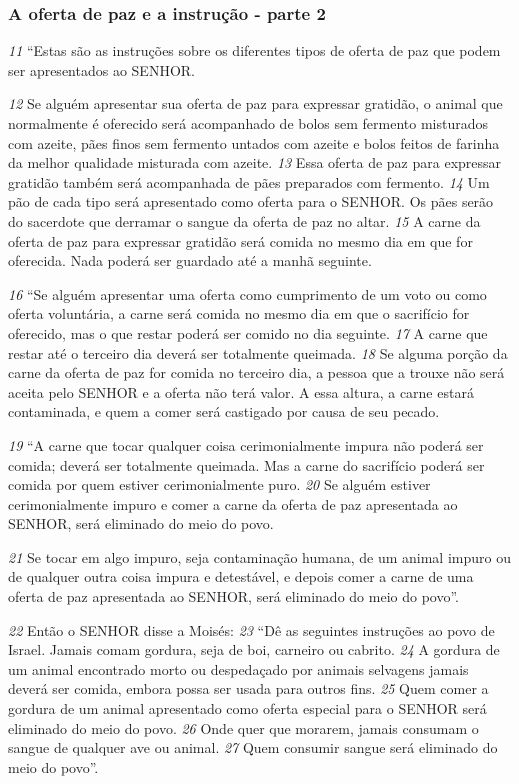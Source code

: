 \bigskip
\subsubsection*{A oferta de paz e a instrução - parte 2}  
\textit{\tiny 11}
“Estas são as instruções sobre os diferentes tipos de oferta de paz que podem
ser apresentados ao SENHOR. 

\smallskip
\textit{\tiny 12}
Se alguém apresentar sua oferta de paz para
expressar gratidão, o animal que normalmente é oferecido será acompanhado de
bolos sem fermento misturados com azeite, pães finos sem fermento untados
com azeite e bolos feitos de farinha da melhor qualidade misturada com azeite.
\textit{\tiny 13}
Essa oferta de paz para expressar gratidão também será acompanhada de pães
preparados com fermento. 
\textit{\tiny 14}
Um pão de cada tipo será apresentado como oferta
para o SENHOR. Os pães serão do sacerdote que derramar o sangue da oferta de
paz no altar. 
\textit{\tiny 15}
A carne da oferta de paz para expressar gratidão será comida no
mesmo dia em que for oferecida. Nada poderá ser guardado até a manhã
seguinte.
   
\smallskip
\textit{\tiny 16}
“Se alguém apresentar uma oferta como cumprimento de um voto ou como
oferta voluntária, a carne será comida no mesmo dia em que o sacrifício for
oferecido, mas o que restar poderá ser comido no dia seguinte. 
\textit{\tiny 17}
A carne que
restar até o terceiro dia deverá ser totalmente queimada. 
\textit{\tiny 18}
Se alguma porção da
carne da oferta de paz for comida no terceiro dia, a pessoa que a trouxe não será
aceita pelo SENHOR e a oferta não terá valor. A essa altura, a carne estará
contaminada, e quem a comer será castigado por causa de seu pecado.
   
\smallskip
\textit{\tiny 19}
“A carne que tocar qualquer coisa cerimonialmente impura não poderá ser
comida; deverá ser totalmente queimada. Mas a carne do sacrifício poderá ser
comida por quem estiver cerimonialmente puro. 
\textit{\tiny 20}
Se alguém estiver
cerimonialmente impuro e comer a carne da oferta de paz apresentada ao SENHOR,
será eliminado do meio do povo. 

\smallskip
\textit{\tiny 21}
Se tocar em algo impuro, seja contaminação
humana, de um animal impuro ou de qualquer outra coisa impura e detestável, e
depois comer a carne de uma oferta de paz apresentada ao SENHOR, será
eliminado do meio do povo”.

\smallskip
\textit{\tiny 22}
Então o SENHOR disse a Moisés: 
\textit{\tiny 23}
“Dê as seguintes instruções ao povo de Israel.
Jamais comam gordura, seja de boi, carneiro ou cabrito. 
\textit{\tiny 24}
A gordura de um
animal encontrado morto ou despedaçado por animais selvagens jamais deverá
ser comida, embora possa ser usada para outros fins. 
\textit{\tiny 25}
Quem comer a gordura de
um animal apresentado como oferta especial para o SENHOR será eliminado do
meio do povo. 
\textit{\tiny 26}
Onde quer que morarem, jamais consumam o sangue de
qualquer ave ou animal. 
\textit{\tiny 27}
Quem consumir sangue será eliminado do meio do
povo”.

